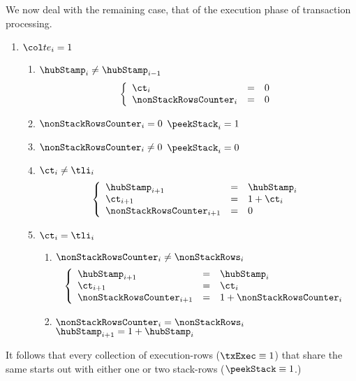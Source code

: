 We now deal with the remaining case, that of the execution phase of transaction processing.
\begin{enumerate}[resume]
	\item \If $\te_{i} = 1$ \Then
		\begin{enumerate}
			\item \If $\hubStamp_{i} \neq \hubStamp_{i - 1}$ \Then 
				\[
					\left\{ \begin{array}{lcl}
						\ct_{i} & = & 0 \\
						\nonStackRowsCounter_{i} & = & 0 \\
					\end{array} \right.
				\]
			\item \If $\nonStackRowsCounter_{i} = 0$ \Then $\peekStack_{i} = 1$
			\item \If $\nonStackRowsCounter_{i} \neq 0$ \Then $\peekStack_{i} = 0$
			\item \If $\ct_{i} \neq \tli_{i}$ \Then 
				\[
					\left\{ \begin{array}{lcl}
						\hubStamp_{i + 1} & = & \hubStamp_{i} \\
						\ct_{i + 1} & = & 1 + \ct_{i} \\
						\nonStackRowsCounter_{i + 1} & = & 0 \\
					\end{array} \right.
				\]
			\item \If $\ct_{i} = \tli_{i}$ \Then 
				\begin{enumerate}
					\item \If $\nonStackRowsCounter_{i} \neq \nonStackRows_{i}$ \Then
						\[
							\left\{ \begin{array}{lcl}
								\hubStamp_{i + 1} & = & \hubStamp_{i} \\
								\ct_{i + 1} & = & \ct_{i} \\
								\nonStackRowsCounter_{i + 1} & = & 1 + \nonStackRowsCounter_{i} \\
							\end{array} \right.
						\]
					\item \If $\nonStackRowsCounter_{i} = \nonStackRows_{i}$ \Then $\hubStamp_{i + 1} = 1 + \hubStamp_{i}$
				\end{enumerate}
		\end{enumerate}
\end{enumerate}
\saNote{} It follows that every collection of execution-rows ($\txExec \equiv 1$) that share the same \hubStamp{} starts out with either one or two stack-rows ($\peekStack \equiv 1$.)

